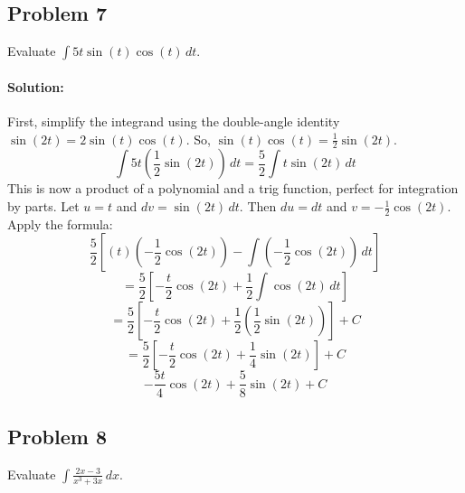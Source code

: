 \documentclass{article}
\begin{document}
\subsection{Problem 7}
Evaluate $\int 5t \sin(t)\cos(t) \, dt$.
\paragraph{Solution:} First, simplify the integrand using the double-angle identity $\sin(2t) = 2\sin(t)\cos(t)$.
So, $\sin(t)\cos(t) = \frac{1}{2}\sin(2t)$.
\[ \int 5t \left( \frac{1}{2}\sin(2t) \right) \, dt = \frac{5}{2} \int t \sin(2t) \, dt \]
This is now a product of a polynomial and a trig function, perfect for integration by parts.
Let $u = t$ and $dv = \sin(2t) \, dt$.
Then $du = dt$ and $v = -\frac{1}{2}\cos(2t)$.
Apply the formula:
\[ \frac{5}{2} \left[ (t)\left(-\frac{1}{2}\cos(2t)\right) - \int \left(-\frac{1}{2}\cos(2t)\right) \, dt \right] \]
\[ = \frac{5}{2} \left[ -\frac{t}{2}\cos(2t) + \frac{1}{2} \int \cos(2t) \, dt \right] \]
\[ = \frac{5}{2} \left[ -\frac{t}{2}\cos(2t) + \frac{1}{2} \left(\frac{1}{2}\sin(2t)\right) \right] + C \]
\[ = \frac{5}{2} \left[ -\frac{t}{2}\cos(2t) + \frac{1}{4}\sin(2t) \right] + C \]
\[ \boxed{-\frac{5t}{4}\cos(2t) + \frac{5}{8}\sin(2t) + C} \]

\subsection{Problem 8}
Evaluate $\int \frac{2x-3}{x^3 + 3x} \, dx$.
\end{document}
